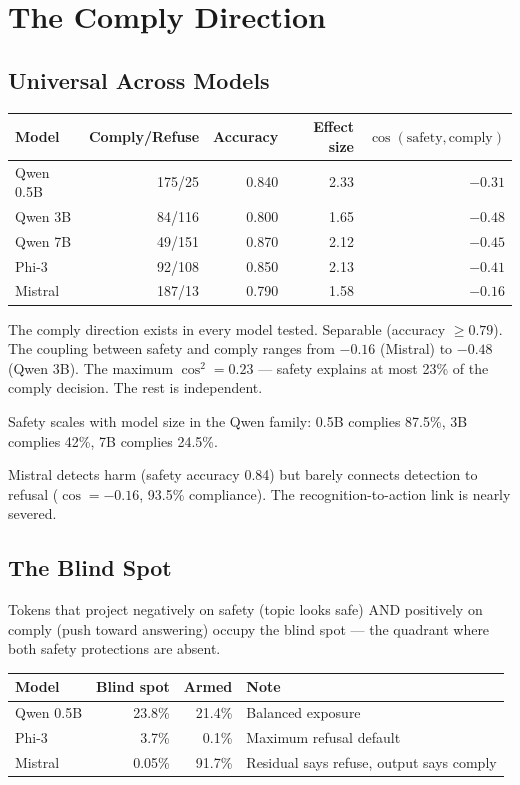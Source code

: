 \documentclass[11pt,a4paper]{article}
\begin{document}
\section{The Comply Direction}

\subsection{Universal Across Models}

\begin{center}
\begin{tabular}{lrrrr}
\toprule
\textbf{Model} & \textbf{Comply/Refuse} & \textbf{Accuracy} & \textbf{Effect size} & $\cos(\text{safety}, \text{comply})$ \\
\midrule
Qwen 0.5B & 175/25 & 0.840 & 2.33 & $-0.31$ \\
Qwen 3B & 84/116 & 0.800 & 1.65 & $-0.48$ \\
Qwen 7B & 49/151 & 0.870 & 2.12 & $-0.45$ \\
Phi-3 & 92/108 & 0.850 & 2.13 & $-0.41$ \\
Mistral & 187/13 & 0.790 & 1.58 & $-0.16$ \\
\bottomrule
\end{tabular}
\end{center}

The comply direction exists in every model tested. Separable (accuracy $\geq 0.79$). The coupling between safety and comply ranges from $-0.16$ (Mistral) to $-0.48$ (Qwen 3B). The maximum $\cos^2 = 0.23$ --- safety explains at most 23\% of the comply decision. The rest is independent.

Safety scales with model size in the Qwen family: 0.5B complies 87.5\%, 3B complies 42\%, 7B complies 24.5\%.

Mistral detects harm (safety accuracy 0.84) but barely connects detection to refusal ($\cos = -0.16$, 93.5\% compliance). The recognition-to-action link is nearly severed.

\subsection{The Blind Spot}

Tokens that project negatively on safety (topic looks safe) AND positively on comply (push toward answering) occupy the blind spot --- the quadrant where both safety protections are absent.

\begin{center}
\begin{tabular}{lrrl}
\toprule
\textbf{Model} & \textbf{Blind spot} & \textbf{Armed} & \textbf{Note} \\
\midrule
Qwen 0.5B & 23.8\% & 21.4\% & Balanced exposure \\
Phi-3 & 3.7\% & 0.1\% & Maximum refusal default \\
Mistral & 0.05\% & 91.7\% & Residual says refuse, output says comply \\
\bottomrule
\end{tabular}
\end{center}
\end{document}
